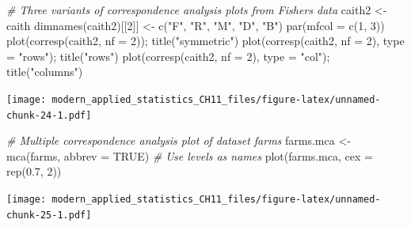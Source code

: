\documentclass[
]{article}
\newenvironment{Shaded}{\begin{snugshade}}{\end{snugshade}}
\newcommand{\AttributeTok}[1]{\textcolor[rgb]{0.77,0.63,0.00}{#1}}
\newcommand{\CommentTok}[1]{\textcolor[rgb]{0.56,0.35,0.01}{\textit{#1}}}
\newcommand{\ConstantTok}[1]{\textcolor[rgb]{0.00,0.00,0.00}{#1}}
\newcommand{\DecValTok}[1]{\textcolor[rgb]{0.00,0.00,0.81}{#1}}
\newcommand{\FloatTok}[1]{\textcolor[rgb]{0.00,0.00,0.81}{#1}}
\newcommand{\FunctionTok}[1]{\textcolor[rgb]{0.00,0.00,0.00}{#1}}
\newcommand{\NormalTok}[1]{#1}
\newcommand{\OtherTok}[1]{\textcolor[rgb]{0.56,0.35,0.01}{#1}}
\newcommand{\StringTok}[1]{\textcolor[rgb]{0.31,0.60,0.02}{#1}}
\begin{document}
\begin{Shaded}
\begin{Highlighting}[]
\CommentTok{\# Three variants of correspondence analysis plots from Fisher\textquotesingle{}s data}
\NormalTok{caith2 }\OtherTok{\textless{}{-}}\NormalTok{ caith}
\FunctionTok{dimnames}\NormalTok{(caith2)[[}\DecValTok{2}\NormalTok{]] }\OtherTok{\textless{}{-}} \FunctionTok{c}\NormalTok{(}\StringTok{"F"}\NormalTok{, }\StringTok{"R"}\NormalTok{, }\StringTok{"M"}\NormalTok{, }\StringTok{"D"}\NormalTok{, }\StringTok{"B"}\NormalTok{)}
\FunctionTok{par}\NormalTok{(}\AttributeTok{mfcol =} \FunctionTok{c}\NormalTok{(}\DecValTok{1}\NormalTok{, }\DecValTok{3}\NormalTok{))}
\FunctionTok{plot}\NormalTok{(}\FunctionTok{corresp}\NormalTok{(caith2, }\AttributeTok{nf =} \DecValTok{2}\NormalTok{)); }\FunctionTok{title}\NormalTok{(}\StringTok{"symmetric"}\NormalTok{)}
\FunctionTok{plot}\NormalTok{(}\FunctionTok{corresp}\NormalTok{(caith2, }\AttributeTok{nf =} \DecValTok{2}\NormalTok{), }\AttributeTok{type =} \StringTok{"rows"}\NormalTok{); }\FunctionTok{title}\NormalTok{(}\StringTok{"rows"}\NormalTok{)}
\FunctionTok{plot}\NormalTok{(}\FunctionTok{corresp}\NormalTok{(caith2, }\AttributeTok{nf =} \DecValTok{2}\NormalTok{), }\AttributeTok{type =} \StringTok{"col"}\NormalTok{); }\FunctionTok{title}\NormalTok{(}\StringTok{"columns"}\NormalTok{)}
\end{Highlighting}
\end{Shaded}

\texttt{[image: modern\_applied\_statistics\_CH11\_files/figure-latex/unnamed-chunk-24-1.pdf]}

\begin{Shaded}
\begin{Highlighting}[]
\CommentTok{\# Multiple correspondence analysis plot of dataset farms}
\NormalTok{farms.mca }\OtherTok{\textless{}{-}} \FunctionTok{mca}\NormalTok{(farms, }\AttributeTok{abbrev =} \ConstantTok{TRUE}\NormalTok{)  }\CommentTok{\# Use levels as names}
\FunctionTok{plot}\NormalTok{(farms.mca, }\AttributeTok{cex =} \FunctionTok{rep}\NormalTok{(}\FloatTok{0.7}\NormalTok{, }\DecValTok{2}\NormalTok{))}
\end{Highlighting}
\end{Shaded}

\texttt{[image: modern\_applied\_statistics\_CH11\_files/figure-latex/unnamed-chunk-25-1.pdf]}
\end{document}

